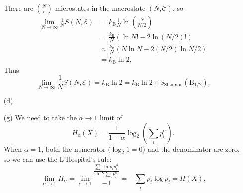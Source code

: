 \documentclass[hyperref, a4paper]{article}
\begin{document}
\begin{itemize}
There are $\binom{N}{\epsilon}$ microstates in the macrostate $(N ,\mathcal{C})$,
so 
\[
    \begin{aligned}
        \lim_{N \to \infty} \frac{1}{N} S(N, \mathcal{E}) &= k_{\text{B}} \frac{1}{N} \ln \binom{N}{N / 2} \\
        &= \frac{k_{\text{B}}}{N} (\ln N! - 2 \ln (N/2)!) \\
        &\approx \frac{k_{\text{B}}}{N} (N \ln N - 2 (N / 2) \ln N/2 ) \\
        &= k_{\text{B}} \ln 2.
    \end{aligned}
\]
Thus 
\begin{equation}
    \lim_{N \to \infty} \frac{1}{N} S(N, \mathcal{E}) = k_{\text{B}} \ln 2 = k_{\text{B}} \ln 2 \times S_{\text{Shannon}} (\mathrm{B}_{1/2}).
\end{equation}

\item[(d)] 

\item[(g)] We need to take the $\alpha \to 1$ limit of 
\begin{equation}
    H_\alpha(X) = \frac{1}{1 - \alpha} \log_2 \left( \sum_i p_i^\alpha \right) .
\end{equation}
When $\alpha = 1$, both the numerator ($\log_2 1 = 0$) and the denominator are zero,
so we can use the L'Hospital's rule:
\[
    \lim_{\alpha \to 1} H_{\alpha} = \lim_{\alpha \to 1} \frac{\frac{\sum_{i} \ln p_i p_i^\alpha}{\ln 2 \sum_{i} p_i^\alpha}}{-1}
    = - \sum_i p_i \log p_i = H(X).
\]

\end{itemize}
\end{document}
